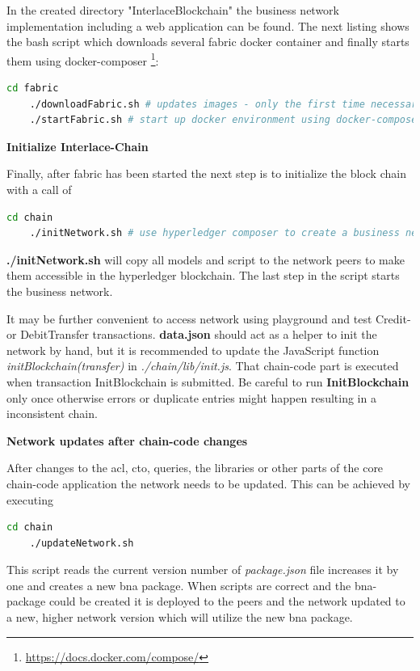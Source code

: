 In the created directory "InterlaceBlockchain" the business network implementation including a web application can be found. The next listing shows the bash script which downloads several fabric docker container and finally starts them using docker-composer \footnote{\url{https://docs.docker.com/compose/}}:

\begin{lstlisting}[language=bash]
	cd fabric
	./downloadFabric.sh # updates images - only the first time necessary
	./startFabric.sh # start up docker environment using docker-compose
\end{lstlisting}

\textbf{Initialize Interlace-Chain}

Finally, after fabric has been started the next step is to initialize the block chain with a call of

\begin{lstlisting}[language=bash]
	cd chain
	./initNetwork.sh # use hyperledger composer to create a business network and deploy it
\end{lstlisting}

\textbf{./initNetwork.sh} will copy all models and script to the network peers to make them accessible in the hyperledger blockchain. The last step in the script starts the business network.

It may be further convenient to access network using playground and test Credit- or DebitTransfer transactions. \textbf{data.json} should act as a helper to init the network by hand, but it is recommended to update the JavaScript function \textit{initBlockchain(transfer)} in \textit{./chain/lib/init.js}. That chain-code part is executed when transaction InitBlockchain is submitted. Be careful to run \textbf{InitBlockchain} only once otherwise errors or duplicate entries might happen resulting in a inconsistent chain.

\textbf{Network updates after chain-code changes}

After changes to the acl, cto, queries, the libraries or other parts of the core chain-code application the network needs to be updated. This can be achieved by executing

\begin{lstlisting}[language=bash]
	cd chain
	./updateNetwork.sh
\end{lstlisting}

This script reads the current version number of \textit{package.json} file increases it by one and creates a new bna package. When scripts are correct and the bna-package could be created it is deployed to the peers and the network updated to a new, higher network version which will utilize the new bna package.

